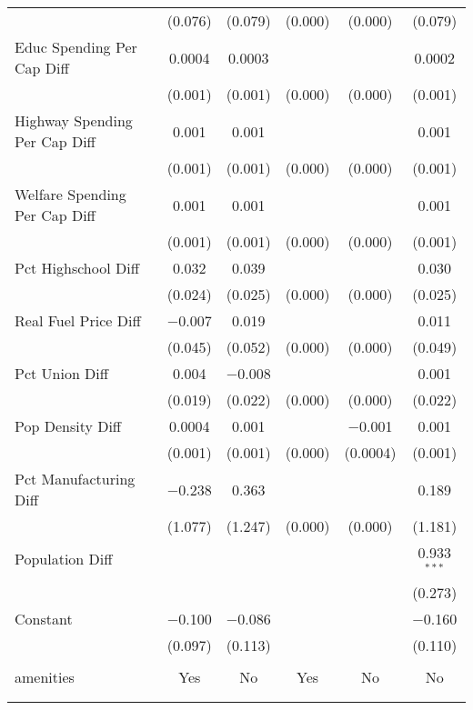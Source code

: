 \begin{table}[!htbp]
\begin{tabular}{@{\extracolsep{5pt}}lccccc}
  & (0.076) & (0.079) & (0.000) & (0.000) & (0.079) \\ 
  Educ Spending Per Cap Diff & 0.0004 & 0.0003 &  &  & 0.0002 \\ 
  & (0.001) & (0.001) & (0.000) & (0.000) & (0.001) \\ 
  Highway Spending Per Cap Diff & 0.001 & 0.001 &  &  & 0.001 \\ 
  & (0.001) & (0.001) & (0.000) & (0.000) & (0.001) \\ 
  Welfare Spending Per Cap Diff & 0.001 & 0.001 &  &  & 0.001 \\ 
  & (0.001) & (0.001) & (0.000) & (0.000) & (0.001) \\ 
  Pct Highschool Diff & 0.032 & 0.039 &  &  & 0.030 \\ 
  & (0.024) & (0.025) & (0.000) & (0.000) & (0.025) \\ 
  Real Fuel Price Diff & $-$0.007 & 0.019 &  &  & 0.011 \\ 
  & (0.045) & (0.052) & (0.000) & (0.000) & (0.049) \\ 
  Pct Union Diff & 0.004 & $-$0.008 &  &  & 0.001 \\ 
  & (0.019) & (0.022) & (0.000) & (0.000) & (0.022) \\ 
  Pop Density Diff & 0.0004 & 0.001 &  & $-$0.001 & 0.001 \\ 
  & (0.001) & (0.001) & (0.000) & (0.0004) & (0.001) \\ 
  Pct Manufacturing Diff & $-$0.238 & 0.363 &  &  & 0.189 \\ 
  & (1.077) & (1.247) & (0.000) & (0.000) & (1.181) \\ 
  Population Diff &  &  &  &  & 0.933$^{***}$ \\ 
  &  &  &  &  & (0.273) \\ 
  Constant & $-$0.100 & $-$0.086 &  &  & $-$0.160 \\ 
  & (0.097) & (0.113) &  &  & (0.110) \\ 
 \hline \\[-1.8ex] 
amenities & Yes & No & Yes & No & No \\ 
\hline \\[-1.8ex] 
\hline 
\hline \\[-1.8ex] 
\end{tabular} 
\end{table} 

